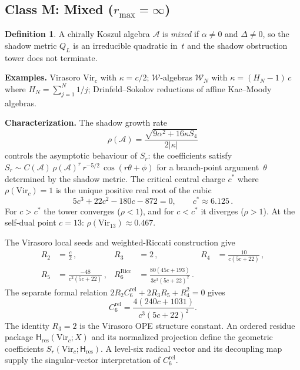 \documentclass[11pt]{article}
\theoremstyle{plain}
\theoremstyle{definition}
\newtheorem{definition}[theorem]{Definition}
\theoremstyle{remark}
\providecommand{\cA}{\mathcal{A}}
\providecommand{\cW}{\mathcal{W}}
\providecommand{\Vir}{\mathrm{Vir}}
\begin{document}
\subsection{Class M: Mixed ($r_{\max} = \infty$)}

\begin{definition}\label{def:class-M}
A chirally Koszul algebra $\cA$ is \emph{mixed} if
$\alpha \neq 0$ and $\Delta \neq 0$, so the shadow metric
$Q_L$ is an irreducible quadratic in~$t$ and the shadow obstruction tower
does not terminate.
\end{definition}

\noindent\textbf{Examples.}
Virasoro $\mathrm{Vir}_c$ with $\kappa = c/2$;
$\cW$-algebras $\cW_N$ with $\kappa = (H_N - 1)\,c$ where
$H_N = \sum_{j=1}^{N} 1/j$;
Drinfeld--Sokolov reductions of affine Kac--Moody algebras.

\noindent\textbf{Characterization.}
The shadow growth rate
\[
\rho(\cA) = \frac{\sqrt{9\alpha^2 + 16\kappa S_4}}{2|\kappa|}
\]
controls the asymptotic behaviour of $S_r$: the coefficients satisfy
$S_r \sim C(\cA)\, \rho(\cA)^r\, r^{-5/2}\, \cos(r\theta + \phi)$
for a branch-point argument~$\theta$ determined by the shadow metric.
The critical central charge $c^*$ where $\rho(\mathrm{Vir}_c) = 1$ is the
unique positive real root of the cubic
\begin{equation}\label{eq:critical-cubic}
5c^3 + 22c^2 - 180c - 872 = 0,
\qquad
c^* \approx 6.125\,.
\end{equation}
For $c > c^*$ the tower converges ($\rho < 1$), and for $c < c^*$ it
diverges ($\rho > 1$). At the self-dual point $c = 13$:
$\rho(\mathrm{Vir}_{13}) \approx 0.467$.

The Virasoro local seeds and weighted-Riccati construction give
\begin{align}
R_2 &= \tfrac{c}{2}\,, &
R_3 &= 2\,, &
R_4 &= \frac{10}{c(5c+22)}\,,
\label{eq:vir-S234} \\
R_5 &= \frac{-48}{c^2(5c+22)}\,, &
R_6^{\mathrm{Ricc}} &=
\frac{80(45c+193)}{3c^3(5c+22)^2}\,.
\label{eq:vir-S567}
\end{align}
\noindent
The separate formal relation
$2R_2C_6^{\mathrm{rel}}+2R_3R_5+R_4^2=0$ gives
\[
C_6^{\mathrm{rel}}
=\frac{4(240c+1031)}{c^3(5c+22)^2}.
\]
The identity $R_3=2$ is the Virasoro OPE structure constant.
An ordered residue package $\mathsf H_{\mathrm{res}}(\Vir_c;X)$ and
its normalized projection define the geometric coefficients
$S_r(\Vir_c;\mathsf H_{\mathrm{res}})$.  A level-six radical vector
and its decoupling map supply the singular-vector interpretation of
$C_6^{\mathrm{rel}}$.
\end{document}
